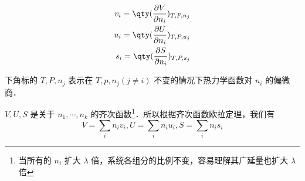 \begin{equation}
\begin{aligned}
v_i=\qty(\frac{\partial V}{\partial n_i})_{T,P,n_j}\\
u_i=\qty(\frac{\partial U}{\partial n_i})_{T,P,u_j}\\
s_i=\qty(\frac{\partial S}{\partial n_i})_{T,P,s_j}
\end{aligned}
\end{equation}

下角标的 $T,P,n_j$ 表示在 $T,p,n_j(j\neq i)$ 不变的情况下热力学函数对 $n_i$ 的偏微商．

$V,U,S$ 是关于 $n_1,\cdots,n_k$ 的齐次函数\footnote{当所有的 $n_i$ 扩大 $\lambda$ 倍，系统各组分的比例不变，容易理解其广延量也扩大 $\lambda$ 倍}．所以根据齐次函数欧拉定理，我们有
\begin{equation}
V=\sum_i n_iv_i,U=\sum_i n_iu_i,S=\sum_i n_is_i
\end{equation}
